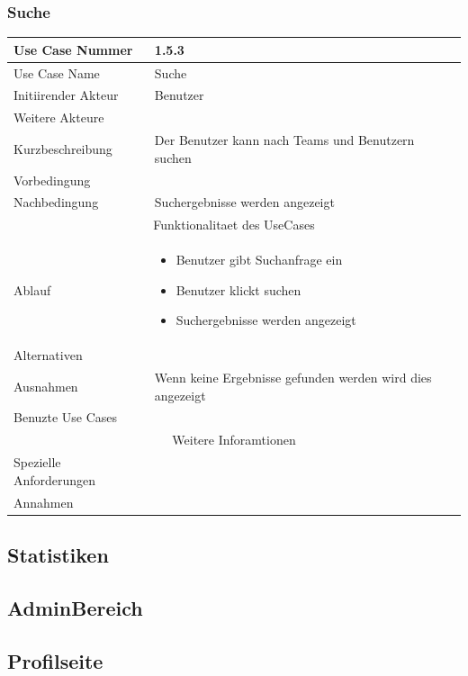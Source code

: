 \documentclass[10pt,a4paper]{article}
\begin{document}
		\subsubsection{Suche}
				\begin{tabular}{|l|p{.5\linewidth}|}
				\hline Use Case Nummer & 1.5.3 \\ 
				\hline Use Case Name & Suche \\ 
				\hline Initiirender Akteur & Benutzer \\
				\hline Weitere Akteure &  \\
				\hline Kurzbeschreibung & Der Benutzer kann nach Teams und Benutzern suchen \\
				\hline Vorbedingung &  \\
				\hline Nachbedingung & Suchergebnisse werden angezeigt \\
				\hline \multicolumn{2}{|c|}{Funktionalitaet des UseCases}\\
				\hline Ablauf & \begin{itemize}
					\item Benutzer gibt Suchanfrage ein
					\item Benutzer klickt suchen
					\item Suchergebnisse werden angezeigt
				\end{itemize} \\
				\hline Alternativen &  \\
				\hline Ausnahmen & Wenn keine Ergebnisse gefunden werden wird dies angezeigt \\
				\hline Benuzte Use Cases &  \\
				\hline \multicolumn{2}{|c|}{Weitere Inforamtionen} \\
				\hline Spezielle Anforderungen &  \\
				\hline Annahmen &  \\
				\hline
				\end{tabular}
\subsection{Statistiken}
\subsection{AdminBereich}
\subsection{Profilseite}
\end{document}
